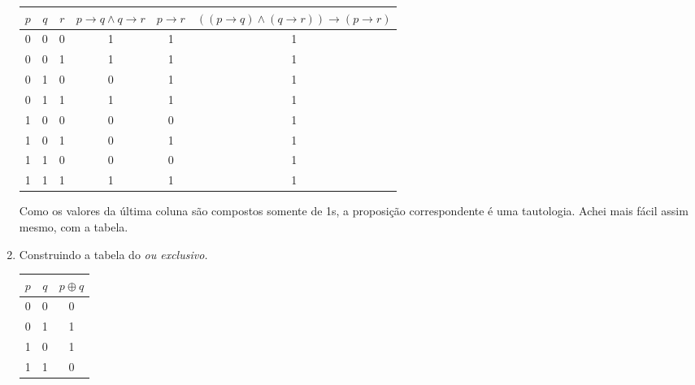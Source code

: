 \documentclass[12pt]{article}
\begin{document}
\begin{enumerate}
        \begin{center}
            \begin{tabular}{|c c c | c c c |} 
                \hline
                \( p \)  & \( q \) & \( r \) & \( p \to q \land q \to r \) & \( p \to r \) & \( ((p \to q) \land (q \to r)) \to ( p \to r) \) \\ [0.5ex]
                \hline\hline
                0 & 0 & 0 & 1 & 1 & 1 \\ 
                \hline
                0 & 0 & 1 & 1 & 1 & 1 \\
                \hline
                0 & 1 & 0 & 0 & 1 & 1 \\
                \hline
                0 & 1 & 1 & 1 & 1 & 1 \\
                \hline
                1 & 0 & 0 & 0 & 0 & 1 \\ 
                \hline
                1 & 0 & 1 & 0 & 1 & 1 \\
                \hline
                1 & 1 & 0 & 0 & 0 & 1 \\
                \hline
                1 & 1 & 1 & 1 & 1 & 1 \\ [1ex]
                \hline
            \end{tabular}
        \end{center}

        Como os valores da última coluna são compostos somente de 1s, a proposição correspondente é uma tautologia. Achei mais fácil assim mesmo, com a tabela.

    \item 
        Construindo a tabela do \textit{ou exclusivo.}

        \begin{center}
            \begin{tabular}{||c c || c||} 
                \hline
                \( p \)  & \( q \) & \( p \oplus q \) \\ [0.5ex]
                \hline\hline
                0 & 0 & 0  \\ 
                \hline
                0 & 1 & 1  \\
                \hline
                1 & 0 & 1  \\
                \hline
                1 & 1 & 0  \\ [1ex]
                \hline
            \end{tabular}
        \end{center}


\end{enumerate}
\end{document}
